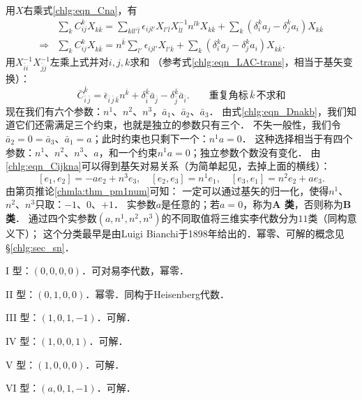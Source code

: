 用$X$右乘式\eqref{chlg:eqn_Cna}，有
\begin{align*}
	&\sum\nolimits_{k} C^k_{ij} X_{k \bar{k}}
	= \sum\nolimits_{kl l'\bar{l}} \epsilon_{ijl'} X_{l' \bar{l}} X^{-1}_{\bar{l}l} n^{lk} X_{k \bar{k}} 
	+\sum\nolimits_{k} (\delta^k_i a_j - \delta^k_j a_i ) X_{k \bar{k}} \\
	\Rightarrow & \sum\nolimits_{k} C^k_{ij} X_{k \bar{k}}
	= n^{\bar{k}}  \sum\nolimits_{ l'}  \epsilon_{ijl'}  X_{l' \bar{k}} 
	+\sum\nolimits_{k} (\delta^k_i a_j - \delta^k_j a_i ) X_{k \bar{k}} .
\end{align*}
用$X^{-1}_{\bar{i}i}X^{-1}_{\bar{j}j}$左乘上式并对$i,j,k$求和
（参考式\eqref{chlg:eqn_LAC-trans}，相当于基矢变换）：
\begin{equation}\label{chlg:eqn_Cijkna}
		\bar{C}^{\bar{k}}_{\bar{i}\,\bar{j}} = \bar{\epsilon}_{\bar{i}\,\bar{j}\,\bar{k}} n^{\bar{k}} 
		+\delta^{\bar{k}}_{\bar{i}} \bar{a}_{\bar{j}} - \delta^{\bar{k}}_{\bar{j}} \bar{a}_{\bar{i}}  .
		\qquad \text{重复角标}\,\bar{k}\,\text{不求和}
\end{equation}
现在我们有六个参数：$n^1$、$n^2$、$n^3$，$\bar{a}_1$、$\bar{a}_2$、$\bar{a}_3$．
由式\eqref{chlg:eqn_Dnakb}，我们知道它们还需满足三个约束，也就是独立的参数只有三个．
不失一般性，我们令$\bar{a}_2=0=\bar{a}_3$、$\bar{a}_1=a$；此时约束也只剩下一个：$n^1 a =0$．
这种选择相当于有四个参数：$n^1$、$n^2$、$n^3$、$a$，和一个约束$n^1 a =0$；独立参数个数没有变化．
由\eqref{chlg:eqn_Cijkna}可以得到基矢对易关系（为简单起见，去掉上面的横线）：
\begin{equation}\label{chlg:eqn_G3-bc}
	[e_1,e_2]=-a e_2 + n^3 e_3,\quad
	[e_2,e_3]= n^1 e_1,\quad
	[e_3,e_1]=n^2 e_2 + a e_3 .
\end{equation}
由第\pageref{chmla:thm_pm1num}页推论\ref{chmla:thm_pm1num}可知：
一定可以通过基矢的归一化，使得$n^1$、$n^2$、$n^3$只取：$-1$、$0$、$+1$．
实参数$a$是任意的；若$a=0$，称为{\bfseries\heiti A 类}，否则称为{\bfseries\heiti B 类}．
通过四个实参数$(a,n^1,n^2,n^3)$的不同取值将三维实李代数分为$11$类（同构意义下）；
这个分类最早是由Luigi Bianchi于1898年给出的．幂零、可解的概念见\S\ref{chlg:sec_sn}．

{I 型}：$(0,0,0,0)$．可对易李代数，幂零．

{II 型}：$(0,1,0,0)$．幂零．同构于Heisenberg代数．

{III 型}：$(1,0,1,-1)$．可解．

{IV 型}：$(1,0,0,1)$．可解．

{V 型}：$(1,0,0,0)$．可解．

{VI 型}：$(a,0,1,-1)$．可解．

